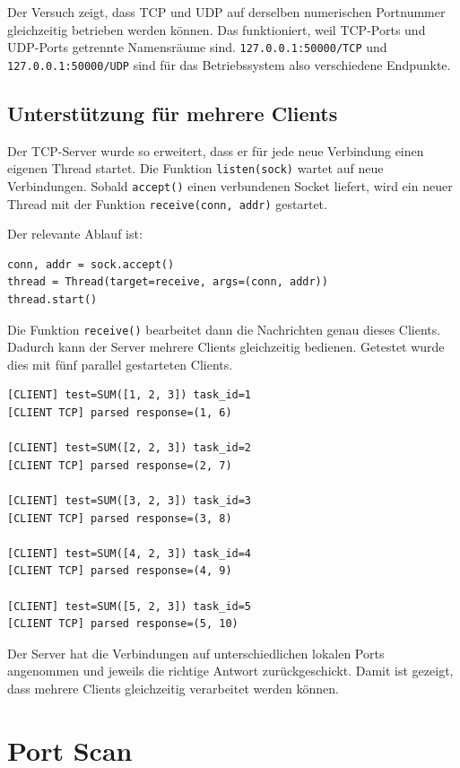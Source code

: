 \documentclass{kdiartcl}
\begin{document}
Der Versuch zeigt, dass TCP und UDP auf derselben numerischen Portnummer gleichzeitig betrieben werden können. Das funktioniert, weil TCP-Ports und UDP-Ports getrennte Namensräume sind. \texttt{127.0.0.1:50000/TCP} und \texttt{127.0.0.1:50000/UDP} sind für das Betriebssystem also verschiedene Endpunkte.

\subsection{Unterstützung für mehrere Clients}

Der TCP-Server wurde so erweitert, dass er für jede neue Verbindung einen eigenen Thread startet. Die Funktion \texttt{listen(sock)} wartet auf neue Verbindungen. Sobald \texttt{accept()} einen verbundenen Socket liefert, wird ein neuer Thread mit der Funktion \texttt{receive(conn, addr)} gestartet.

Der relevante Ablauf ist:

\begin{verbatim}
conn, addr = sock.accept()
thread = Thread(target=receive, args=(conn, addr))
thread.start()
\end{verbatim}

Die Funktion \texttt{receive()} bearbeitet dann die Nachrichten genau dieses Clients. Dadurch kann der Server mehrere Clients gleichzeitig bedienen. Getestet wurde dies mit fünf parallel gestarteten Clients.

\begin{verbatim}
[CLIENT] test=SUM([1, 2, 3]) task_id=1
[CLIENT TCP] parsed response=(1, 6)

[CLIENT] test=SUM([2, 2, 3]) task_id=2
[CLIENT TCP] parsed response=(2, 7)

[CLIENT] test=SUM([3, 2, 3]) task_id=3
[CLIENT TCP] parsed response=(3, 8)

[CLIENT] test=SUM([4, 2, 3]) task_id=4
[CLIENT TCP] parsed response=(4, 9)

[CLIENT] test=SUM([5, 2, 3]) task_id=5
[CLIENT TCP] parsed response=(5, 10)
\end{verbatim}

Der Server hat die Verbindungen auf unterschiedlichen lokalen Ports angenommen und jeweils die richtige Antwort zurückgeschickt. Damit ist gezeigt, dass mehrere Clients gleichzeitig verarbeitet werden können.

\section{Port Scan}
\end{document}
